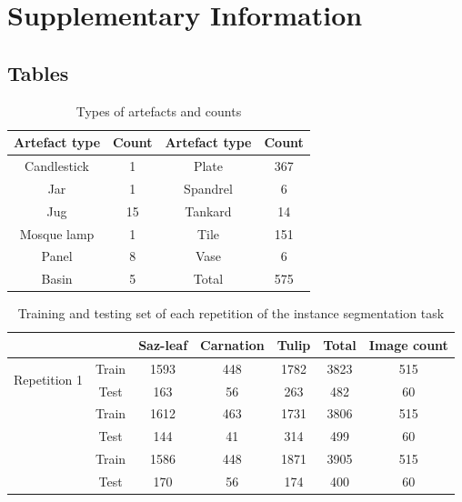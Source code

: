 \documentclass[11pt]{article}
\begin{document}
\clearpage
\printbibliography
\clearpage


\setcounter{table}{0}
\renewcommand{\thetable}{S\arabic{table}}
\setcounter{figure}{0}
\renewcommand{\thefigure}{S\arabic{figure}}


\section{Supplementary Information}
\subsection{Tables}
\begin{table}[H]
\caption{Types of artefacts and counts}
\small
\centering
\begin{tabular}{cccc} 
 \hline
Artefact type & Count & Artefact type & Count \\ 
\hline
Candlestick & 1 & Plate & 367 \\ 
Jar & 1 & Spandrel & 6\\ 
Jug & 15 & Tankard & 14\\ 
Mosque lamp & 1 & Tile & 151\\ 
Panel & 8 & Vase & 6\\ 
Basin & 5 & Total & 575 \\ 
\hline
\end{tabular}
\label{tab:artefacttype}
\end{table}

\begin{table}[H]
\caption{Training and testing set of each repetition of the instance segmentation task}
\small
\centering
\begin{tabular}{ccccccc} 
\hhline{~~-----}
 & & Saz-leaf & Carnation & Tulip & Total & Image count \\ 
\hline
\multirow{2}{*}{Repetition 1} & Train & 1593 & 448 & 1782 & 3823 & 515\\
\hhline{~~~~~~} & Test & 163 & 56 & 263 & 482 & 60\\
\hhline{~------}
\multirow{2}{*}{Repetition 2} & Train & 1612 & 463 & 1731 & 3806 & 515\\
\hhline{~~~~~~} & Test & 144 & 41 & 314 & 499 & 60\\
\hhline{~------}
\multirow{2}{*}{Repetition 3} & Train & 1586 & 448 & 1871 & 3905 & 515\\
\hhline{~~~~~~} & Test & 170 & 56 & 174 & 400 & 60\\
\hline
\end{tabular}
\label{tab:repetition}
\end{table}
\end{document}
